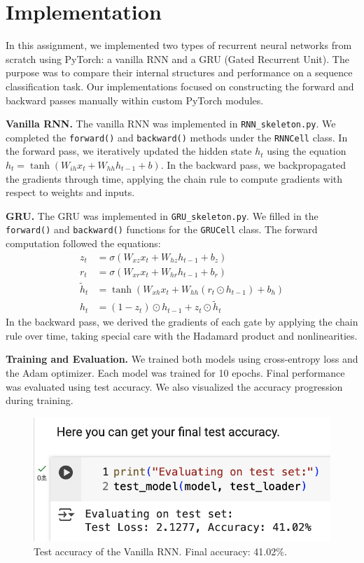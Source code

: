 \section{Implementation}
\label{sec:implementation}

In this assignment, we implemented two types of recurrent neural networks from scratch using PyTorch: a vanilla RNN and a GRU (Gated Recurrent Unit). The purpose was to compare their internal structures and performance on a sequence classification task. Our implementations focused on constructing the forward and backward passes manually within custom PyTorch modules.

\textbf{Vanilla RNN.} The vanilla RNN was implemented in \texttt{RNN\_skeleton.py}. We completed the \texttt{forward()} and \texttt{backward()} methods under the \texttt{RNNCell} class. In the forward pass, we iteratively updated the hidden state $h_t$ using the equation $h_t = \tanh(W_{ih}x_t + W_{hh}h_{t-1} + b)$. In the backward pass, we backpropagated the gradients through time, applying the chain rule to compute gradients with respect to weights and inputs.

\textbf{GRU.} The GRU was implemented in \texttt{GRU\_skeleton.py}. We filled in the \texttt{forward()} and \texttt{backward()} functions for the \texttt{GRUCell} class. The forward computation followed the equations:
\begin{align*}
  z_t &= \sigma(W_{xz}x_t + W_{hz}h_{t-1} + b_z) \\
  r_t &= \sigma(W_{xr}x_t + W_{hr}h_{t-1} + b_r) \\
  \tilde{h}_t &= \tanh(W_{xh}x_t + W_{hh}(r_t \odot h_{t-1}) + b_h) \\
  h_t &= (1 - z_t) \odot h_{t-1} + z_t \odot \tilde{h}_t
\end{align*}
In the backward pass, we derived the gradients of each gate by applying the chain rule over time, taking special care with the Hadamard product and nonlinearities.

\textbf{Training and Evaluation.} We trained both models using cross-entropy loss and the Adam optimizer. Each model was trained for 10 epochs. Final performance was evaluated using test accuracy. We also visualized the accuracy progression during training.

\begin{figure}[h]
\centering
\includegraphics[width=0.8\linewidth]{Vanilla_RNN_accuracy.png}
\caption{Test accuracy of the Vanilla RNN. Final accuracy: 41.02\%.}
\end{figure}

